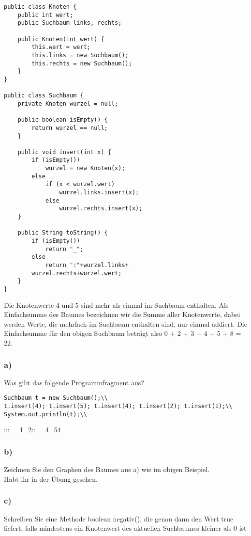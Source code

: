 \documentclass[a4paper, 10pt]{article}
\begin{document}
\begin{lstlisting}
public class Knoten {
	public int wert;
	public Suchbaum links, rechts;

	public Knoten(int wert) {
		this.wert = wert;
		this.links = new Suchbaum();
		this.rechts = new Suchbaum();
	}
}

public class Suchbaum {
	private Knoten wurzel = null;
	
	public boolean isEmpty() {
		return wurzel == null;
	}
	
	public void insert(int x) {
		if (isEmpty())
			wurzel = new Knoten(x);
		else
			if (x < wurzel.wert)
				wurzel.links.insert(x);
			else
				wurzel.rechts.insert(x);
	}

	public String toString() {
		if (isEmpty())
			return "_";
		else
			return ":"+wurzel.links+
		wurzel.rechts+wurzel.wert;
	}
}
\end{lstlisting}

Die Knotenwerte 4 und 5 sind mehr als einmal im Suchbaum enthalten. Als Einfachsumme
des Baumes bezeichnen wir die Summe aller Knotenwerte, dabei werden Werte, die mehrfach
im Suchbaum enthalten sind, nur einmal addiert. Die Einfachsumme für den obigen
Suchbaum beträgt also 0 + 2 + 3 + 4 + 5 + 8 = 22.


\subsubsection*{a)}
Was gibt das folgende Programmfragment aus?\\

\begin{lstlisting}
Suchbaum t = new Suchbaum();\\
t.insert(4); t.insert(5); t.insert(4); t.insert(2); t.insert(1);\\
System.out.println(t);\\
\end{lstlisting}

:::\_\_1\_2::\_\_4\_54
\subsubsection*{b)}
Zeichnen Sie den Graphen des Baumes aus a) wie im obigen Beispiel.\\

Habt ihr in der Übung gesehen.

\subsubsection*{c)}
Schreiben Sie eine Methode boolean negativ(), die genau dann den Wert true
liefert, falls mindestens ein Knotenwert des aktuellen Suchbaumes kleiner als 0 ist\\
\end{document}
